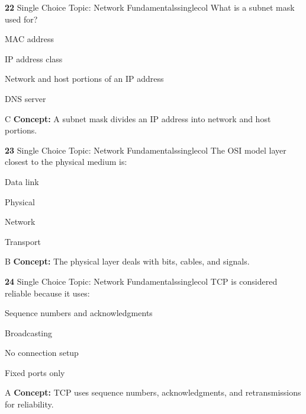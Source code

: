 \documentclass[10pt,a4paper]{article}
\begin{document}
\begin{qcard}{\color{white}\textbf{22} \hfill \small Single Choice \textbar{} Topic: Network Fundamentals}{singlecol}
What is a subnet mask used for?

\begin{qoptions}
\item MAC address
\item IP address class
\item Network and host portions of an IP address
\item DNS server
\end{qoptions}
\begin{explainbox}{C}
\textbf{Concept:} A subnet mask divides an IP address into network and host portions.
\end{explainbox}
\end{qcard}

\begin{qcard}{\color{white}\textbf{23} \hfill \small Single Choice \textbar{} Topic: Network Fundamentals}{singlecol}
The OSI model layer closest to the physical medium is:

\begin{qoptions}
\item Data link
\item Physical
\item Network
\item Transport
\end{qoptions}
\begin{explainbox}{B}
\textbf{Concept:} The physical layer deals with bits, cables, and signals.
\end{explainbox}
\end{qcard}

\begin{qcard}{\color{white}\textbf{24} \hfill \small Single Choice \textbar{} Topic: Network Fundamentals}{singlecol}
TCP is considered reliable because it uses:

\begin{qoptions}
\item Sequence numbers and acknowledgments
\item Broadcasting
\item No connection setup
\item Fixed ports only
\end{qoptions}
\begin{explainbox}{A}
\textbf{Concept:} TCP uses sequence numbers, acknowledgments, and retransmissions for reliability.
\end{explainbox}
\end{qcard}
\end{document}
